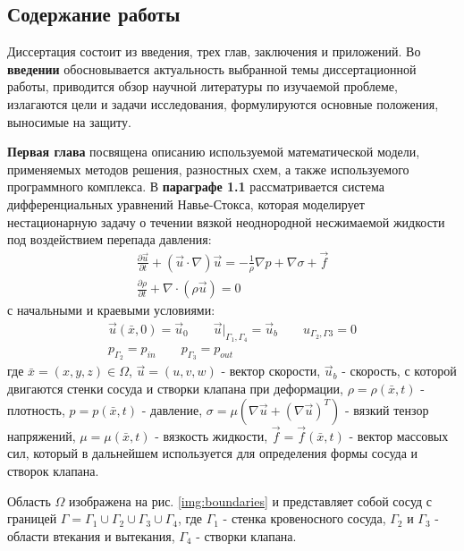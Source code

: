 \subsection*{\Large Содержание работы}
Диссертация состоит из введения, трех глав, заключения и приложений. Во \textbf{введении} обосновывается актуальность выбранной темы диссертационной работы, приводится обзор научной литературы по изучаемой проблеме, излагаются цели и задачи исследования, формулируются основные положения, выносимые на защиту.

\textbf{Первая глава} посвящена описанию используемой математической модели, применяемых методов решения, разностных схем, а также используемого программного комплекса.
В \textbf{параграфе 1.1} рассматривается система дифференциальных уравнений Навье-Стокса, которая моделирует нестационарную задачу о течении вязкой неоднородной несжимаемой жидкости под воздействием перепада давления:
\begin{gather}
    \label{eq:navier_stokes:motion}
    \frac{\partial \vec{u}}{\partial t} + (\vec{u} \cdot \nabla) \vec{u} = - \frac{1}{\rho} \nabla p + \nabla \sigma + \vec{f}\\
    \label{eq:navier_stokes:continuity}
    \frac{\partial \rho}{\partial t} + \nabla \cdot (\rho \vec{u}) = 0 
\end{gather}
с начальными и краевыми условиями:
\begin{gather}
    \label{eq:navier_stokes:velocity_conditions}
    \vec{u}(\bar{x}, 0) = \vec{u}_0 \qquad \vec{u}|_{\Gamma_1, \Gamma_4} = \vec{u}_b \qquad u_{\Gamma_2, \Gamma3} = 0\\
    \label{eq:navier_stokes:pressure_conditions}
    p_{\Gamma_2} = p_{in} \qquad p_{\Gamma_3} = p_{out}
\end{gather}
где $\bar{x}=(x,y,z) \in \Omega$, $\vec{u}=(u,v,w)$ - вектор скорости, $\vec{u}_b$ - скорость, с которой двигаются стенки сосуда и створки клапана при деформации,
$\rho=\rho(\bar{x}, t)$ - плотность, $p=p(\bar{x}, t)$ - давление, $\sigma = \mu (\nabla \vec{u} + (\nabla \vec{u})^T)$ - вязкий тензор напряжений,
$\mu = \mu(\bar{x}, t)$ - вязкость жидкости, $\vec{f} = \vec{f}(\bar{x}, t)$ - вектор массовых сил, который в дальнейшем используется для определения формы сосуда и створок клапана. 

Область $\Omega$ изображена на рис. \ref{img:boundaries} и представляет собой сосуд с границей $\Gamma = \Gamma_1 \cup \Gamma_2 \cup \Gamma_3 \cup \Gamma_4$,
где $\Gamma_1$ - стенка кровеносного сосуда, $\Gamma_2$ и $\Gamma_3$ -  области втекания и вытекания, $\Gamma_4$ - створки клапана.

